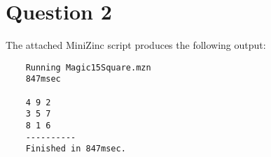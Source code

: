 \documentclass[12pt]{article}
\begin{document}
\pagebreak

\section{Question 2}

The attached MiniZinc script produces the following output:

\begin{lstlisting}
    Running Magic15Square.mzn
    847msec

    4 9 2 
    3 5 7 
    8 1 6 
    ----------
    Finished in 847msec.
\end{lstlisting}
\end{document}
